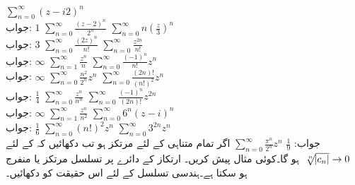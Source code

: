 \quad
$\sum\limits_{n=0}^{\infty} (z-i2)^n$\\
جواب:\quad
$1$
\quad
$\sum\limits_{n=0}^{\infty} \tfrac{(z-2)^n}{2^n}$
\quad
$\sum\limits_{n=0}^{\infty} n(\tfrac{z}{3})^n$\\
جواب:\quad
$3$
\quad
$\sum\limits_{n=0}^{\infty} \tfrac{(2z)^n}{n!}$
\quad
$\sum\limits_{n=0}^{\infty} \tfrac{z^{2n}}{n!}$\\
جواب:\quad
$\infty$
\quad
$\sum\limits_{n=1}^{\infty} \tfrac{z^n}{n}$
\quad
$\sum\limits_{n=0}^{\infty} \tfrac{(-1)^n}{n!}z^n$\\
جواب:\quad
$\infty$
\quad
$\sum\limits_{n=0}^{\infty} \tfrac{n^2}{2^n}z^n$
\quad
$\sum\limits_{n=0}^{\infty} \tfrac{(2n)!}{(n!)^2}z^n$\\
جواب:\quad
$\tfrac{1}{4}$
\quad
$\sum\limits_{n=0}^{\infty} \tfrac{z^n}{n^n}$
\quad
$\sum\limits_{n=0}^{\infty} \tfrac{(-1)^n}{(2n)!}z^{2n}$\\
جواب:\quad
$\infty$
\quad
$\sum\limits_{n=1}^{\infty} \tfrac{z^n}{n^2}$
\quad
$\sum\limits_{n=0}^{\infty} 6^n(z-i)^n$\\
جواب:\quad
$\tfrac{1}{6}$
\quad
$\sum\limits_{n=0}^{\infty} (n!)^2 z^n$
\quad
$\sum\limits_{n=0}^{\infty} 3^{2n}z^n$\\
جواب:\quad
$\tfrac{1}{9}$
\quad
$\sum\limits_{n=0}^{\infty} \tfrac{\pi^n}{2^n}z^n$
\quad
اگر  تمام متناہی  کے لئے مرتکز ہو تب دکھائیں کہ  کے لئے 
$\,\sqrt[\leftroot{-2}n]{\abs{c_n}}\to 0\,$
ہو گا۔کوئی مثال پیش کریں۔
\quad
ارتکاز کے دائرے پر تسلسل مرتکز یا منفرج ہو سکتا ہے۔ہندسی تسلسل کے لئے اس حقیقت کو دکھائیں۔

